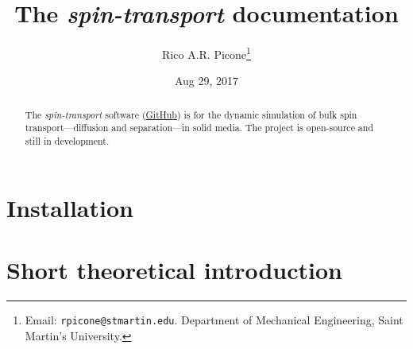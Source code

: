 \documentclass[%
oneside,                 %
final,                   %
10pt]{article}
\let\oldtoc\tableofcontents
\renewcommand{\tableofcontents}{\sffamily\oldtoc}
\begin{document}

\newcommand{\exercisesection}[1]{\subsection*{#1}}






\title{\sffamily\bfseries{}The \emph{spin-transport} documentation}


\author{\sffamily{}Rico A.R. Picone\footnote{Email: \texttt{rpicone@stmartin.edu}. Department of Mechanical Engineering, Saint Martin's University.}}


\date{\sffamily{}Aug 29, 2017}
\maketitle

\begin{abstract}
The \emph{spin-transport} software (\href{{https://github.com/ricopicone/spin-transport}}{GitHub}) is for the dynamic simulation of bulk spin transport---diffusion and separation---in solid media.
The project is open-source and still in development.
\end{abstract}

\tableofcontents


\vspace{1cm} %





\section{Installation}
\label{section:installation}


\section{Short theoretical introduction}
\label{section:shorttheory}










\end{document}

